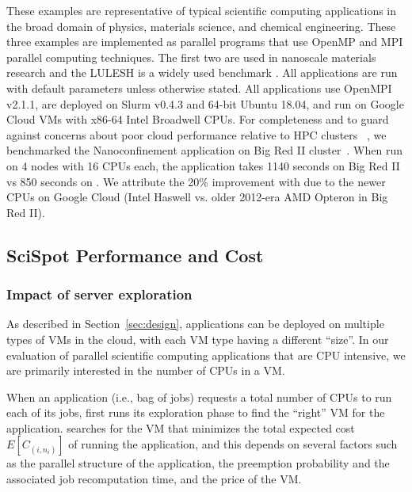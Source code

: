 These examples are representative of typical scientific computing applications in the broad domain of physics, materials science, and chemical engineering. These three examples are implemented as parallel programs that use OpenMP and MPI parallel computing techniques. The first two are used in nanoscale materials research \cite{jso1,jso2,solis2013generating,jjzo1,jto1,jyto} and the LULESH is a widely used benchmark \cite{IPDPS13:LULESH,LULESH2:changes}. All applications are run with default parameters unless otherwise stated. 
All applications use OpenMPI v2.1.1, are deployed on Slurm v0.4.3 and 64-bit Ubuntu 18.04, and run on Google Cloud VMs with x86-64 Intel Broadwell CPUs. 
For completeness and to guard against concerns about poor cloud performance relative to HPC clusters ~\cite{iosup_performance_2011, zhai_cloud_2011, marathe2013comparative, galante_analysis_2016, benedictis_cloud-aware_2014}, we benchmarked the Nanoconfinement application on Big Red II cluster~\cite{bigred2}. 
When run on 4 nodes with 16 CPUs each, the application takes 1140 seconds on Big Red II vs 850 seconds on \sysname. 
We attribute the 20\% improvement with \sysname due to the newer CPUs on Google Cloud (Intel Haswell vs. older 2012-era AMD Opteron in Big Red II).


\vspace*{\subsecspace}
\subsection{SciSpot Performance and Cost}

\subsubsection{Impact of server exploration}

As described in Section~\ref{sec:design}, applications can be deployed on multiple types of VMs in the cloud, with each VM type having a different ``size''.
In our evaluation of parallel scientific computing applications that are CPU intensive, we are primarily interested in the number of CPUs in a VM.

When an application (i.e., bag of jobs) requests a total number of CPUs to run each of its jobs, \sysname first runs its exploration phase to find the ``right'' VM for the application.
\sysname searches for the VM that minimizes the total expected cost $E[C_{(i,n_i)}]$ of running the application, and this depends on several factors such as the parallel structure of the application, the preemption probability and the associated job recomputation time, and the price of the VM.

